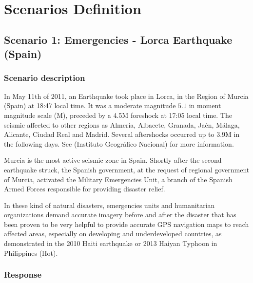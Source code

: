 \chapter{Scenarios Definition}
\label{anex:scenarios}

\section{Scenario 1: Emergencies - Lorca Earthquake (Spain)}
\subsection{Scenario description}
In May 11th of 2011, an Earthquake took place in Lorca, in the Region of Murcia (Spain) at 18:47 local time. It was a moderate magnitude $5.1$ in moment magnitude scale (M), preceded by a 4.5M foreshock at 17:05 local time. The seismic affected to other regions as Almería, Albacete, Granada, Jaén, Málaga, Alicante, Ciudad Real and Madrid. Several aftershocks occurred up to 3.9M in the following days. See (Instituto Geográfico Nacional) for more information.

Murcia is the most active seismic zone in Spain. Shortly after the second earthquake struck, the Spanish government, at the request of regional government of Murcia, activated the Military Emergencies Unit, a branch of the Spanish Armed Forces responsible for providing disaster relief. 

In these kind of natural disasters, emergencies units and humanitarian organizations demand accurate imagery before and after the disaster that has been proven to be very helpful to provide accurate \ac{GPS} navigation maps to reach affected areas, especially on developing and underdeveloped countries, as demonstrated in the 2010 Haiti earthquake or 2013 Haiyan Typhoon in Philippines (Hot).

\subsection{Response}


